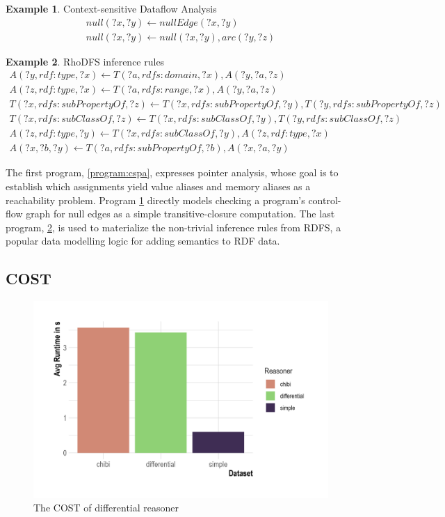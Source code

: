 \documentclass[sigconf,screen,review,natbib]{acmart}
\theoremstyle{definition}
\newtheorem{exmp}{Example}[section]
\begin{document}
\begin{exmp}{Context-sensitive Dataflow Analysis}
	\tiny
	\begin{align}
		null(?x, ?y) \leftarrow nullEdge(?x, ?y) \\
		null(?x, ?y) \leftarrow null(?x, ?y), arc(?y, ?z)
	\end{align}
	\label{program:csda}
\end{exmp}

\begin{exmp}{RhoDFS inference rules}
	\tiny
	\begin{align}
		A(?y, rdf:type, ?x) \leftarrow T(?a, rdfs:domain, ?x), A(?y, ?a, ?z)                                  \\
		A(?z, rdf:type, ?x) \leftarrow T(?a, rdfs:range, ?x), A(?y, ?a, ?z)                                   \\
		T(?x, rdfs:subPropertyOf, ?z) \leftarrow T(?x, rdfs:subPropertyOf, ?y), T(?y, rdfs:subPropertyOf, ?z) \\
		T(?x, rdfs:subClassOf, ?z) \leftarrow T(?x, rdfs:subClassOf, ?y), T(?y, rdfs:subClassOf, ?z)          \\
		A(?z, rdf:type, ?y) \leftarrow T(?x, rdfs:subClassOf, ?y), A(?z, rdf:type, ?x)                        \\
		A(?x, ?b, ?y) \leftarrow T(?a, rdfs:subPropertyOf, ?b), A(?x, ?a, ?y)
	\end{align}
	\label{program:rhodfs}
\end{exmp}

The first program, \ref{program:cspa}\cite{graspan}, expresses pointer analysis, whose goal is to establish which assignments yield value aliases and memory aliases as a reachability problem. Program \ref{program:csda} directly models checking a program's control-flow graph for null edges as a simple transitive-closure computation. The last program, \ref{program:rhodfs}, is used to materialize the non-trivial inference rules from RDFS\cite{rdfs}, a popular data modelling logic for adding semantics to RDF\cite{rdf} data.

\subsection{COST}

\begin{figure}[ht]
	\centering
	\includegraphics[width=.45\textwidth,height=\textheight,keepaspectratio]{COST}
	\caption{The COST of differential reasoner}
	\label{benchmark:cost}
\end{figure}
\end{document}
